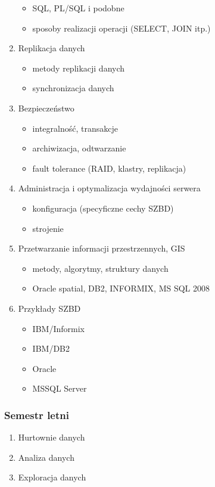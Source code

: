 \documentclass[12pt]{article}
\begin{document}
\begin{enumerate}
\begin{itemize}
\item SQL, PL/SQL i podobne
\item sposoby realizacji operacji (SELECT, JOIN itp.)
\end{itemize}
\item Replikacja danych
\begin{itemize}
\item metody replikacji danych
\item synchronizacja danych
\end{itemize}
\item Bezpieczeństwo
\begin{itemize}
\item integralność, transakcje
\item archiwizacja, odtwarzanie
\item fault tolerance (RAID, klastry, replikacja)
\end{itemize}
\item Administracja i optymalizacja wydajności serwera
\begin{itemize}
\item konfiguracja (specyficzne cechy SZBD)
\item strojenie
\end{itemize}
\item Przetwarzanie informacji przestrzennych, GIS
\begin{itemize}
\item metody, algorytmy, struktury danych
\item Oracle spatial, DB2, INFORMIX, MS SQL 2008
\end{itemize}
\item Przykłady SZBD
\begin{itemize}
\item IBM/Informix
\item IBM/DB2
\item Oracle
\item MSSQL Server
\end{itemize}
\end{enumerate}

\subsubsection{Semestr letni}
\begin{enumerate}
\item Hurtownie danych
\item Analiza danych
\item Exploracja danych
\end{enumerate}
\end{document}
